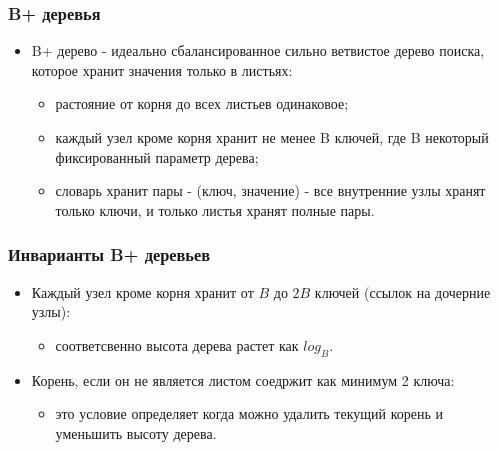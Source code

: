 \begin{frame}
\frametitle{B+ деревья}
\begin{itemize}
  \item B+ дерево - идеально сбалансированное сильно ветвистое дерево
  поиска, которое хранит значения только в листьях:
  \begin{itemize}
    \item растояние от корня до всех листьев одинаковое;
    \item каждый узел кроме корня хранит не менее B ключей, где B
    некоторый фиксированный параметр дерева;
    \item словарь хранит пары - (ключ, значение) - все внутренние узлы
    хранят только ключи, и только листья хранят полные пары.
  \end{itemize}
\end{itemize}
\end{frame}

\begin{frame}
\frametitle{Инварианты B+ деревьев}
\begin{itemize}
  \item Каждый узел кроме корня хранит от $B$ до $2B$ ключей (ссылок на
  дочерние узлы):
  \begin{itemize}
    \item соответсвенно высота дерева растет как $log_B$.
  \end{itemize}
  \item Корень, если он не является листом соедржит как минимум 2 ключа:
  \begin{itemize}
    \item это условие определяет когда можно удалить текущий корень и уменьшить 
    высоту дерева.
  \end{itemize}
\end{itemize}
\end{frame}

